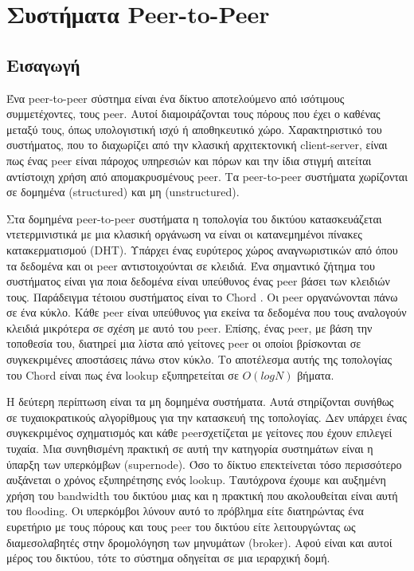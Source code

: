 \chapter{Συστήματα Peer-to-Peer}
\label{chap:P2P}

\section{Εισαγωγή}

Ένα peer-to-peer σύστημα είναι ένα δίκτυο αποτελούμενο από ισότιμους 
συμμετέχοντες, τους peer. Αυτοί διαμοιράζονται τους πόρους που έχει ο 
καθένας μεταξύ τους, όπως υπολογιστική ισχύ ή αποθηκευτικό χώρο. 
Χαρακτηριστικό του συστήματος, που το διαχωρίζει από την κλασική 
αρχιτεκτονική client-server, είναι πως ένας peer είναι πάροχος υπηρεσιών 
και πόρων και την ίδια στιγμή αιτείται αντίστοιχη χρήση από 
απομακρυσμένους peer. Τα peer-to-peer συστήματα χωρίζονται σε δομημένα 
(structured) και μη (unstructured). 

Στα δομημένα peer-to-peer συστήματα η τοπολογία του δικτύου 
κατασκευάζεται ντετερμινιστικά με μια κλασική οργάνωση να είναι οι 
κατανεμημένοι πίνακες κατακερματισμού (DHT). Υπάρχει ένας ευρύτερος 
χώρος αναγνωριστικών από όπου τα δεδομένα και οι peer αντιστοιχούνται σε 
κλειδιά. Ένα σημαντικό ζήτημα του συστήματος είναι για ποια δεδομένα 
είναι υπεύθυνος ένας peer βάσει των κλειδιών τους. Παράδειγμα τέτοιου 
συστήματος είναι το Chord \citep{Tanenbaum2006}. Οι peer οργανώνονται 
πάνω σε ένα κύκλο. Κάθε peer είναι υπεύθυνος για εκείνα τα δεδομένα που 
τους αναλογούν κλειδιά μικρότερα σε σχέση με αυτό του peer. Επίσης, ένας 
peer, με βάση την τοποθεσία του, διατηρεί μια λίστα από γείτονες peer οι 
οποίοι βρίσκονται σε συγκεκριμένες αποστάσεις πάνω στον κύκλο. Το 
αποτέλεσμα αυτής της τοπολογίας του Chord είναι πως ένα lookup 
εξυπηρετείται σε $O(logN)$ βήματα.

Η δεύτερη περίπτωση είναι τα μη δομημένα συστήματα. Αυτά στηρίζονται 
συνήθως σε τυχαιοκρατικούς αλγορίθμους για την κατασκευή της τοπολογίας. 
Δεν υπάρχει ένας συγκεκριμένος σχηματισμός και κάθε peerσχετίζεται με 
γείτονες που έχουν επιλεγεί τυχαία. Μια συνηθισμένη πρακτική σε αυτή την 
κατηγορία συστημάτων είναι η ύπαρξη των υπερκόμβων (supernode). Όσο το 
δίκτυο επεκτείνεται τόσο περισσότερο αυξάνεται ο χρόνος εξυπηρέτησης 
ενός lookup. Ταυτόχρονα έχουμε και αυξημένη χρήση του bandwidth του 
δικτύου μιας και η πρακτική που ακολουθείται είναι αυτή του flooding. Οι 
υπερκόμβοι λύνουν αυτό το πρόβλημα είτε διατηρώντας ένα ευρετήριο με 
τους πόρους και τους peer του δικτύου είτε λειτουργώντας ως 
διαμεσολαβητές στην δρομολόγηση των μηνυμάτων (broker). Αφού είναι και 
αυτοί μέρος του δικτύου, τότε το σύστημα οδηγείται σε μια ιεραρχική 
δομή.

